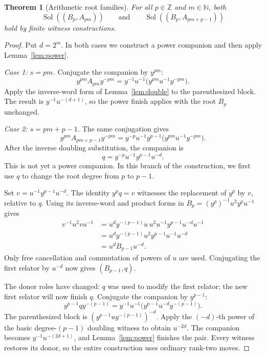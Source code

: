 \documentclass[11pt]{article}
\newtheorem{theorem}{Theorem}[section]
\theoremstyle{definition}\newtheorem{definition}[theorem]{Definition}
\theoremstyle{remark}\newtheorem{remark}[theorem]{Remark}
\newcommand{\Sol}{\operatorname{Sol}}
\begin{document}
\begin{theorem}[Arithmetic root families]\label{thm:rootfamilies}
For all $p\in\mathbb Z$ and $m\in\mathbb N$, both
\[
\Sol((B_p,A_{pm}))\qquad\text{and}\qquad\Sol((B_p,A_{pm+p-1}))
\]
hold by finite witness constructions.
\end{theorem}
\begin{proof}
Put $d=2^m$. In both cases we construct a power companion and then apply Lemma~\ref{lem:power}.

\emph{Case 1: $s=pm$.} Conjugate the companion by $y^{pm}$:
\[
y^{pm}A_{pm}y^{-pm}=y^{-1}u^{-1}\bigl(y^{pm}u^{-1}y^{-pm}\bigr).
\]
Apply the inverse-word form of Lemma~\ref{lem:double} to the parenthesized block. The result is $y^{-1}u^{-(d+1)}$, so the power finish applies with the root $B_p$ unchanged.

\emph{Case 2: $s=pm+p-1$.} The same conjugation gives
\[
y^{pm}A_{pm+p-1}y^{-pm}
=y^{-p}u^{-1}y^{p-1}\bigl(y^{pm}u^{-1}y^{-pm}\bigr).
\]
After the inverse doubling substitution, the companion is
\begin{equation}\label{eq:q}
q=y^{-p}u^{-1}y^{p-1}u^{-d}.
\end{equation}
This is not yet a power companion. In this branch of the construction, we first use $q$ to change the root degree from $p$ to $p-1$.

Set $v=u^{-1}y^{p-1}u^{-d}$. The identity $y^pq=v$ witnesses the replacement of $y^p$ by $v$, relative to $q$. Using its inverse-word and product forms in $B_p=(y^p)^{-1}u^2y^pu^{-1}$ gives
\[
\begin{aligned}
v^{-1}u^2vu^{-1}
&=u^dy^{-(p-1)}u\,u^2u^{-1}y^{p-1}u^{-d}u^{-1}\\
&=u^dy^{-(p-1)}u^2y^{p-1}u^{-1}u^{-d}\\
&=u^dB_{p-1}u^{-d}.
\end{aligned}
\]
Only free cancellation and commutation of powers of $u$ are used. Conjugating the first relator by $u^{-d}$ now gives $(B_{p-1},q)$.

The donor roles have changed: $q$ was used to modify the first relator; the new first relator will now finish $q$. Conjugate the companion by $y^{p-1}$:
\[
y^{p-1}qy^{-(p-1)}
=y^{-1}u^{-1}\bigl(y^{p-1}u^{-d}y^{-(p-1)}\bigr).
\]
The parenthesized block is $(y^{p-1}uy^{-(p-1)})^{-d}$. Apply the $(-d)$-th power of the basic degree-$(p-1)$ doubling witness to obtain $u^{-2d}$. The companion becomes $y^{-1}u^{-(2d+1)}$, and Lemma~\ref{lem:power} finishes the pair. Every witness restores its donor, so the entire construction uses ordinary rank-two moves.
\end{proof}
\end{document}
